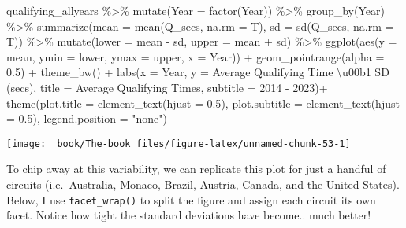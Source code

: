 \documentclass[
]{book}
\newenvironment{Shaded}{\begin{snugshade}}{\end{snugshade}}
\newcommand{\AttributeTok}[1]{\textcolor[rgb]{0.77,0.63,0.00}{#1}}
\newcommand{\FloatTok}[1]{\textcolor[rgb]{0.00,0.00,0.81}{#1}}
\newcommand{\FunctionTok}[1]{\textcolor[rgb]{0.00,0.00,0.00}{#1}}
\newcommand{\NormalTok}[1]{#1}
\newcommand{\SpecialCharTok}[1]{\textcolor[rgb]{0.00,0.00,0.00}{#1}}
\newcommand{\StringTok}[1]{\textcolor[rgb]{0.31,0.60,0.02}{#1}}
\begin{document}
\begin{Shaded}
\begin{Highlighting}[]
\NormalTok{qualifying\_allyears }\SpecialCharTok{\%\textgreater{}\%}
  \FunctionTok{mutate}\NormalTok{(}\AttributeTok{Year =} \FunctionTok{factor}\NormalTok{(Year)) }\SpecialCharTok{\%\textgreater{}\%}
  \FunctionTok{group\_by}\NormalTok{(Year) }\SpecialCharTok{\%\textgreater{}\%}
  \FunctionTok{summarize}\NormalTok{(}\AttributeTok{mean =} \FunctionTok{mean}\NormalTok{(Q\_secs, }\AttributeTok{na.rm =}\NormalTok{ T),}
            \AttributeTok{sd =} \FunctionTok{sd}\NormalTok{(Q\_secs, }\AttributeTok{na.rm =}\NormalTok{ T)) }\SpecialCharTok{\%\textgreater{}\%} 
  \FunctionTok{mutate}\NormalTok{(}\AttributeTok{lower =}\NormalTok{ mean  }\SpecialCharTok{{-}}\NormalTok{ sd,}
         \AttributeTok{upper =}\NormalTok{ mean }\SpecialCharTok{+}\NormalTok{ sd) }\SpecialCharTok{\%\textgreater{}\%}
  \FunctionTok{ggplot}\NormalTok{(}\FunctionTok{aes}\NormalTok{(}\AttributeTok{y =}\NormalTok{ mean, }\AttributeTok{ymin =}\NormalTok{ lower, }\AttributeTok{ymax =}\NormalTok{ upper, }\AttributeTok{x =}\NormalTok{ Year)) }\SpecialCharTok{+}
  \FunctionTok{geom\_pointrange}\NormalTok{(}\AttributeTok{alpha =} \FloatTok{0.5}\NormalTok{) }\SpecialCharTok{+}
  \FunctionTok{theme\_bw}\NormalTok{() }\SpecialCharTok{+}
  \FunctionTok{labs}\NormalTok{(}\AttributeTok{x =} \StringTok{\textquotesingle{}Year\textquotesingle{}}\NormalTok{,}
       \AttributeTok{y =} \StringTok{\textquotesingle{}Average Qualifying Time \textbackslash{}u00b1 SD (secs)\textquotesingle{}}\NormalTok{,}
       \AttributeTok{title =} \StringTok{\textquotesingle{}Average Qualifying Times\textquotesingle{}}\NormalTok{,}
       \AttributeTok{subtitle =} \StringTok{\textquotesingle{}2014 {-} 2023\textquotesingle{}}\NormalTok{)}\SpecialCharTok{+}
  \FunctionTok{theme}\NormalTok{(}\AttributeTok{plot.title =} \FunctionTok{element\_text}\NormalTok{(}\AttributeTok{hjust =} \FloatTok{0.5}\NormalTok{),}
        \AttributeTok{plot.subtitle =} \FunctionTok{element\_text}\NormalTok{(}\AttributeTok{hjust =} \FloatTok{0.5}\NormalTok{),}
        \AttributeTok{legend.position =} \StringTok{"none"}\NormalTok{)}
\end{Highlighting}
\end{Shaded}

\begin{center}\texttt{[image: \_book/The-book\_files/figure-latex/unnamed-chunk-53-1]} \end{center}

To chip away at this variability, we can replicate this plot for just a handful of circuits (i.e.~Australia, Monaco, Brazil, Austria, Canada, and the United States). Below, I use \texttt{facet\_wrap()} to split the figure and assign each circuit its own facet. Notice how tight the standard deviations have become.. much better!
\end{document}
